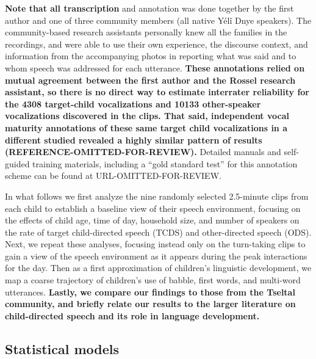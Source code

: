 \documentclass[,man,floatsintext]{apa6}
\begin{document}
\textbf{Note that all transcription} and annotation was done together by
the first author and one of three community members (all native Yélî
Dnye speakers). The community-based research assistants personally knew
all the families in the recordings, and were able to use their own
experience, the discourse context, and information from the accompanying
photos in reporting what was said and to whom speech was addressed for
each utterance. \textbf{These annotations relied on mutual agreement
between the first author and the Rossel research assistant, so there is
no direct way to estimate interrater reliability for the 4308
target-child vocalizations and 10133 other-speaker vocalizations
discovered in the clips. That said, independent vocal maturity
annotations of these same target child vocalizations in a different
studied revealed a highly similar pattern of results
(REFERENCE-OMITTED-FOR-REVIEW).} Detailed manuals and self-guided
training materials, including a \enquote{gold standard test} for this
annotation scheme can be found at URL-OMITTED-FOR-REVIEW.

In what follows we first analyze the nine randomly selected 2.5-minute
clips from each child to establish a baseline view of their speech
environment, focusing on the effects of child age, time of day,
household size, and number of speakers on the rate of target
child-directed speech (TCDS) and other-directed speech (ODS). Next, we
repeat these analyses, focusing instead only on the turn-taking clips to
gain a view of the speech environment as it appears during the peak
interactions for the day. Then as a first approximation of children's
linguistic development, we map a coarse trajectory of children's use of
babble, first words, and multi-word utterances. \textbf{Lastly, we
compare our findings to those from the Tseltal community, and briefly
relate our results to the larger literature on child-directed speech and
its role in language development.}

\subsection{Statistical models}\label{statistical-models}
\end{document}
